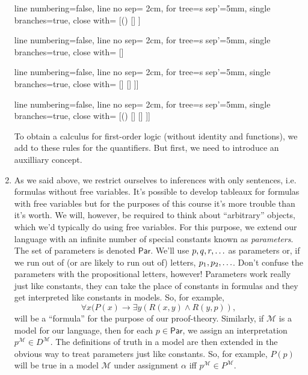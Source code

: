 \begin{enumerate}[\thesection.1]
\begin{center}
					\begin{prooftree}
					{
					line numbering=false,
					line no sep= 2cm,
					for tree={s sep'=5mm},
					single branches=true,
					close with=\xmark
					}
					[\neg (\phi\to\psi) [\phi [\neg \psi ] ] ]
					\end{prooftree}
					\begin{prooftree}
					{
					line numbering=false,
					line no sep= 2cm,
					for tree={s sep'=5mm},
					single branches=true,
					close with=\xmark
					}
					[\phi\to\psi [\neg \phi ] [\psi ] ]
					\end{prooftree}
					\begin{prooftree}
					{
					line numbering=false,
					line no sep= 2cm,
					for tree={s sep'=5mm},
					single branches=true,
					close with=\xmark
					}
					[\phi\leftrightarrow \psi [\phi [\psi] ] [\neg \phi [\neg \psi] ] ]]
					\end{prooftree}
					\begin{prooftree}
					{
					line numbering=false,
					line no sep= 2cm,
					for tree={s sep'=5mm},
					single branches=true,
					close with=\xmark
					}
					[\neg(\phi\leftrightarrow \psi) [\phi [\neg \psi] ] [\neg \phi [ \psi] ] ]]
					\end{prooftree}

				\end{center}
		To obtain a calculus for first-order logic (without identity and functions), we add to these rules for the quantifiers. But first, we need to introduce an auxilliary concept.
		
		\item As we said above, we restrict ourselves to inferences with only sentences, i.e. formulas without free variables. It's possible to develop tableaux for formulas with free variables but for the purposes of this course it's more trouble than it's worth. We will, however, be required to think about ``arbitrary'' objects, which we'd typically do using free variables. For this purpose, we extend our language with an infinite number of special constants known as \emph{parameters}. The set of parameters is denoted $\mathsf{Par}$. We'll use $p,q,r,\mathellipsis$ as parameters or, if we run out of (or are likely to run out of) letters, $p_1, p_2,\mathellipsis$. Don't confuse the parameters with the propositional letters, however! Parameters work really just like constants, they can take the place of constants in formulas and they get interpreted like constants in models. So, for example, \[\forall x(P(x)\to \exists y(R(x,y)\land R(y,p)),\] will be a ``formula'' for the purpose of our proof-theory. Similarly, if $\mathcal{M}$ is a model for our language, then for each $p\in \mathsf{Par}$, we assign an interpretation $p^\mathcal{M}\in D^\mathcal{M}$. The definitions of truth in a model are then extended in the obvious way to treat parameters just like constants. So, for example, $P(p)$ will be true in a model $\mathcal{M}$ under assignment $\alpha$ iff $p^\mathcal{M}\in P^\mathcal{M}$. 
		

\end{enumerate}

